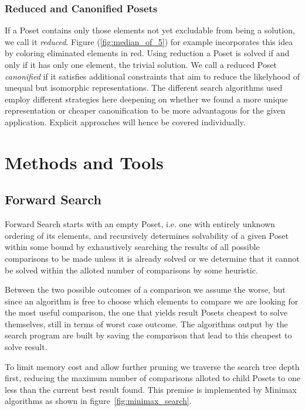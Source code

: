 \documentclass[10pt,journal,compsoc]{IEEEtran}
\begin{document}
\subsubsection{Reduced and Canonified Posets}

If a Poset contains only those elements not yet excludable from being a solution, we call it \textit{reduced}. 
Figure (\ref{fig:median_of_5}) for example incorporates this idea by
coloring eliminated elements in red.
Using reduction a Poset is solved if and only if it has only one element, the trivial solution.
We call a reduced Poset \textit{canonified} if it satisfies additional constraints that
aim to reduce the likelyhood of unequal but isomorphic representations.
The different search algorithms used employ different strategies here deepening on whether we
found a more unique representation or cheaper canonification to be more advantagous for
the given application. Explicit approaches will hence be covered individually.


\section{Methods and Tools}
\subsection{Forward Search}\label{chapter:forward_search}
Forward Search starts with an empty Poset, i.e. one with entirely unknown ordering of its elements,
and recursively determines solvability of a given Poset within some bound by exhaustively searching
the results of all possible comparisons to be made unless it is already solved or we determine that
it cannot be solved within the alloted number of comparisons by some heuristic.

Between the two possible outcomes of a comparison we assume the worse, but since an algorithm is
free to choose which elements to compare we are looking for the most useful comparison, the one that
yields result Posets cheapest to solve themselves, still in terms of worst case outcome. The
algorithms output by the search program are built by saving the comparison that lead to this
cheapest to solve result.

To limit memory cost and allow further pruning we traverse the search tree depth first, reducing the
maximum number of comparisons alloted to child Posets to one less than the current best result
found. This premise is implemented by Minimax algorithms as shown in
figure~\ref{fig:minimax_search}.
\end{document}

